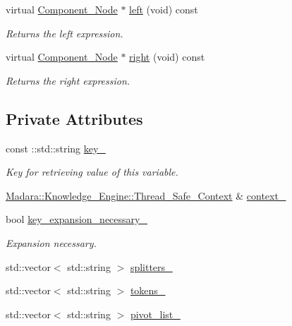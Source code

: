 \begin{DoxyCompactItemize}
virtual \hyperlink{classMadara_1_1Expression__Tree_1_1Component__Node}{Component\_\-Node} $\ast$ \hyperlink{classMadara_1_1Expression__Tree_1_1Component__Node_abe0c7474f1af4cb06d06ab13479a89db}{left} (void) const 
\begin{DoxyCompactList}\small\item\em Returns the left expression. \item\end{DoxyCompactList}\item 
virtual \hyperlink{classMadara_1_1Expression__Tree_1_1Component__Node}{Component\_\-Node} $\ast$ \hyperlink{classMadara_1_1Expression__Tree_1_1Component__Node_a672f2b18b4e63efda38e9063a47bc30f}{right} (void) const 
\begin{DoxyCompactList}\small\item\em Returns the right expression. \item\end{DoxyCompactList}\end{DoxyCompactItemize}
\subsection*{Private Attributes}
\begin{DoxyCompactItemize}
\item 
const ::std::string \hyperlink{classMadara_1_1Expression__Tree_1_1Variable__Node_a4777ea77f74c58e68314afb95d255ee8}{key\_\-}
\begin{DoxyCompactList}\small\item\em Key for retrieving value of this variable. \item\end{DoxyCompactList}\item 
\hyperlink{classMadara_1_1Knowledge__Engine_1_1Thread__Safe__Context}{Madara::Knowledge\_\-Engine::Thread\_\-Safe\_\-Context} \& \hyperlink{classMadara_1_1Expression__Tree_1_1Variable__Node_acb34ad7593b57413e185135bce5614f8}{context\_\-}
\item 
bool \hyperlink{classMadara_1_1Expression__Tree_1_1Variable__Node_a6995a5a6417f6103ec5aaa465c7af6cd}{key\_\-expansion\_\-necessary\_\-}
\begin{DoxyCompactList}\small\item\em Expansion necessary. \item\end{DoxyCompactList}\item 
std::vector$<$ std::string $>$ \hyperlink{classMadara_1_1Expression__Tree_1_1Variable__Node_a80651fa347cb92ec7803228f4ee78f16}{splitters\_\-}
\item 
std::vector$<$ std::string $>$ \hyperlink{classMadara_1_1Expression__Tree_1_1Variable__Node_afb71d8424471fa78309c7a1306bff684}{tokens\_\-}
\item 
std::vector$<$ std::string $>$ \hyperlink{classMadara_1_1Expression__Tree_1_1Variable__Node_ad0ff5eb1d8d6302592c7d1e0a648d8ec}{pivot\_\-list\_\-}
\end{DoxyCompactItemize}


